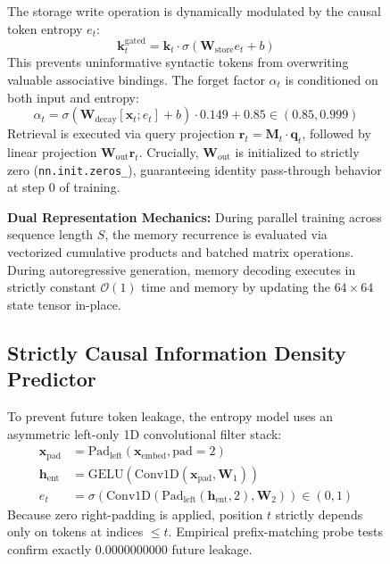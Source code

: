 \documentclass[10pt,twocolumn,letterpaper]{article}
\begin{document}
\begin{figure}[t]
The storage write operation is dynamically modulated by the causal token entropy $e_t$:
\begin{equation}
    \mathbf{k}_t^{\text{gated}} = \mathbf{k}_t \cdot \sigma(\mathbf{W}_{\text{store}} e_t + b)
\end{equation}
This prevents uninformative syntactic tokens from overwriting valuable associative bindings. The forget factor $\alpha_t$ is conditioned on both input and entropy:
\begin{equation}
    \alpha_t = \sigma(\mathbf{W}_{\text{decay}} [\mathbf{x}_t; e_t] + b) \cdot 0.149 + 0.85 \in (0.85, 0.999)
\end{equation}
Retrieval is executed via query projection $\mathbf{r}_t = \mathbf{M}_t \cdot \mathbf{q}_t$, followed by linear projection $\mathbf{W}_{\text{out}} \mathbf{r}_t$. Crucially, $\mathbf{W}_{\text{out}}$ is initialized to strictly zero (\texttt{nn.init.zeros\_}), guaranteeing identity pass-through behavior at step 0 of training.

\textbf{Dual Representation Mechanics:} During parallel training across sequence length $S$, the memory recurrence is evaluated via vectorized cumulative products and batched matrix operations. During autoregressive generation, memory decoding executes in strictly constant $\mathcal{O}(1)$ time and memory by updating the $64 \times 64$ state tensor in-place.

\subsection{Strictly Causal Information Density Predictor}
To prevent future token leakage, the entropy model uses an asymmetric left-only 1D convolutional filter stack:
\begin{align}
    \mathbf{x}_{\text{pad}} &= \text{Pad}_{\text{left}}(\mathbf{x}_{\text{embed}}, \text{pad}=2) \\
    \mathbf{h}_{\text{ent}} &= \text{GELU}(\text{Conv1D}(\mathbf{x}_{\text{pad}}, \mathbf{W}_1)) \\
    e_t &= \sigma(\text{Conv1D}(\text{Pad}_{\text{left}}(\mathbf{h}_{\text{ent}}, 2), \mathbf{W}_2)) \in (0, 1)
\end{align}
Because zero right-padding is applied, position $t$ strictly depends only on tokens at indices $\le t$. Empirical prefix-matching probe tests confirm exactly $0.0000000000$ future leakage.


\end{figure}
\end{document}
